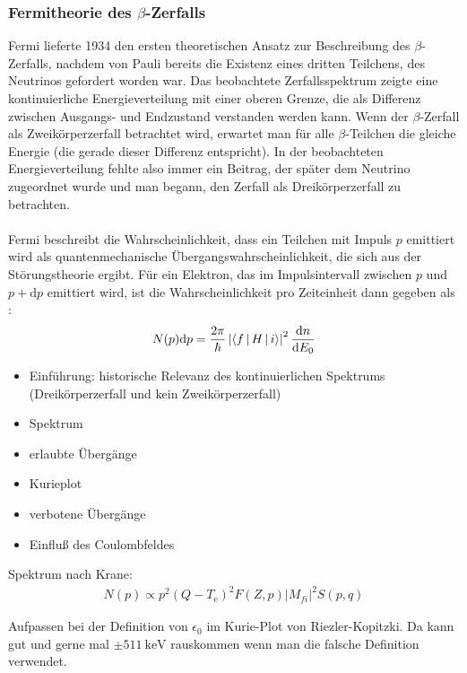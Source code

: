 \documentclass[11pt, a4paper]{article}
\numberwithin{equation}{section}
\begin{document}
\subsubsection{Fermitheorie des $\beta$-Zerfalls}
Fermi lieferte 1934 den ersten theoretischen Ansatz zur Beschreibung des $\beta$-Zerfalls, nachdem von Pauli bereits die Existenz eines dritten Teilchens, des Neutrinos gefordert worden war.
Das beobachtete Zerfallsspektrum zeigte eine kontinuierliche Energieverteilung mit einer oberen Grenze, die als Differenz zwischen Ausgangs- und Endzustand verstanden werden kann.
Wenn der $\beta$-Zerfall als Zweikörperzerfall betrachtet wird, erwartet man für alle $\beta$-Teilchen die gleiche Energie (die gerade dieser Differenz entspricht).\cite{krane}
In der beobachteten Energieverteilung fehlte also immer ein Beitrag, der später dem Neutrino zugeordnet wurde und man begann, den Zerfall als Dreikörperzerfall zu betrachten.
\\
\\
Fermi beschreibt die Wahrscheinlichkeit, dass ein Teilchen mit Impuls $p$ emittiert wird als quantenmechanische Übergangswahrscheinlichkeit, die sich aus der Störungstheorie ergibt.
Für ein Elektron, das im Impulsintervall zwischen $p$ und $p+\text{d}p$ emittiert wird, ist die Wahrscheinlichkeit pro Zeiteinheit dann gegeben als \cite{mayer-kuckuk}:
\begin{align}
	N(p)\text{d}p = \frac{2\pi}{\hbar}\left|\Braket{f|H|i}\right|^2\frac{\text{d}n}{\text{d}E_0}
\end{align}
\begin{itemize}
	\item Einführung: historische Relevanz des kontinuierlichen Spektrums (Dreikörperzerfall und kein Zweikörperzerfall)
	\item Spektrum
	\item erlaubte Übergänge
	\item Kurieplot
	\item verbotene Übergänge
	\item Einfluß des Coulombfeldes
\end{itemize}

Spektrum nach Krane:
\begin{align}
	N(p) \propto p^2 \left( Q - T_\mathrm{e} \right)^2 F(Z, p) \left| M_{fi} \right|^2 S(p, q)
\end{align}

Aufpassen bei der Definition von $\epsilon_0$ im Kurie-Plot von Riezler-Kopitzki.
Da kann gut und gerne mal $\pm \SI{511}{\kilo\electronvolt}$ rauskommen wenn man die falsche Definition verwendet.
\end{document}
